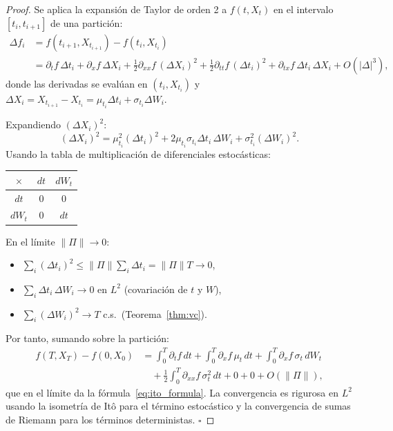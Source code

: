\begin{proof}
Se aplica la expansión de Taylor de orden 2 a $f(t,X_t)$ en el intervalo
$[t_i, t_{i+1}]$ de una partición:
\begin{align*}
  \Delta f_i
  &= f(t_{i+1},X_{t_{i+1}}) - f(t_i,X_{t_i}) \\
  &= \partial_t f\,\Delta t_i
   + \partial_x f\,\Delta X_i
   + \frac{1}{2}\partial_{xx}f\,(\Delta X_i)^2
   + \frac{1}{2}\partial_{tt}f\,(\Delta t_i)^2
   + \partial_{tx}f\,\Delta t_i\,\Delta X_i
   + O(|\Delta|^3),
\end{align*}
donde las derivadas se evalúan en $(t_i, X_{t_i})$ y $\Delta X_i =
X_{t_{i+1}}-X_{t_i} = \mu_{t_i}\Delta t_i + \sigma_{t_i}\Delta W_i$.

Expandiendo $(\Delta X_i)^2$:
\[
  (\Delta X_i)^2
  = \mu_{t_i}^2(\Delta t_i)^2
  + 2\mu_{t_i}\sigma_{t_i}\Delta t_i\,\Delta W_i
  + \sigma_{t_i}^2(\Delta W_i)^2.
\]
Usando la tabla de multiplicación de diferenciales estocásticas:
\begin{center}
\begin{tabular}{ccc}
\toprule
$\times$ & $dt$ & $dW_t$ \\
\midrule
$dt$ & $0$ & $0$ \\
$dW_t$ & $0$ & $dt$ \\
\bottomrule
\end{tabular}
\end{center}
En el límite $\|\Pi\| \to 0$:
\begin{itemize}
  \item $\sum_i (\Delta t_i)^2 \leq \|\Pi\|\sum_i\Delta t_i = \|\Pi\|T \to 0$,
  \item $\sum_i \Delta t_i\,\Delta W_i \to 0$ en $L^2$ (covariación de $t$ y $W$),
  \item $\sum_i (\Delta W_i)^2 \to T$ c.s.\ (Teorema~\ref{thm:vc}).
\end{itemize}

Por tanto, sumando sobre la partición:
\begin{align*}
  f(T,X_T) - f(0,X_0)
  &= \int_0^T \partial_t f\,dt
   + \int_0^T \partial_x f\,\mu_t\,dt
   + \int_0^T \partial_x f\,\sigma_t\,dW_t \\
  &\quad + \frac{1}{2}\int_0^T \partial_{xx}f\,\sigma_t^2\,dt
   + 0 + 0 + O(\|\Pi\|),
\end{align*}
que en el límite da la fórmula~\eqref{eq:ito_formula}. La convergencia es
rigurosa en $L^2$ usando la isometría de Itô para el término estocástico y
la convergencia de sumas de Riemann para los términos deterministas. $\square$
\end{proof}

